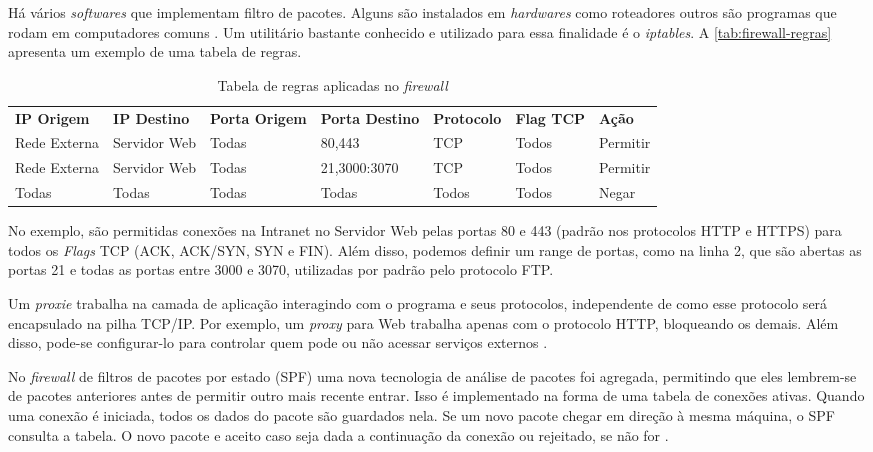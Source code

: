 Há vários \textit{softwares} que implementam filtro de pacotes. Alguns são instalados em \textit{hardwares} como roteadores outros são programas que rodam em computadores comuns \cite{univhacker}. Um utilitário bastante conhecido e utilizado para essa finalidade é o \textit{iptables}. A \autoref{tab:firewall-regras} apresenta um exemplo de uma tabela de regras.

\begin{table}[htb]
\ABNTEXfontereduzida
\centering
\caption{Tabela de regras aplicadas no \textit{firewall}}
\label{tab:firewall-regras}
\begin{tabular}{l|l|l|l|l|l|l}
    \textbf{IP Origem} & \textbf{IP Destino}  & \textbf{Porta Origem}  & \textbf{Porta Destino} & \textbf{Protocolo} & \textbf{Flag TCP} & \textbf{Ação} \\
    Rede Externa & Servidor Web & Todas & 80,443 & TCP & Todos & Permitir \\
    Rede Externa & Servidor Web & Todas & 21,3000:3070 & TCP & Todos & Permitir \\
    Todas & Todas & Todas & Todas & Todos & Todos & Negar \\
\end{tabular}
\end{table}

No exemplo, são permitidas conexões na Intranet no Servidor Web pelas portas 80 e 443 (padrão nos protocolos HTTP e HTTPS) para todos os \textit{Flags} TCP (ACK, ACK/SYN, SYN e FIN). Além disso, podemos definir um range de portas, como na linha 2, que são abertas as portas 21 e todas as portas entre 3000 e 3070, utilizadas por padrão pelo protocolo FTP.

Um \textit{proxie} trabalha na camada de aplicação interagindo com o programa e seus protocolos, independente de como esse protocolo será encapsulado na pilha TCP/IP. Por exemplo, um \textit{proxy} para Web trabalha apenas com o protocolo HTTP, bloqueando os demais. Além disso, pode-se configurar-lo para controlar quem pode ou não acessar serviços externos \cite{univhacker}.

No \textit{firewall} de filtros de pacotes por estado (SPF) uma nova tecnologia de análise de pacotes foi agregada, permitindo que eles lembrem-se de pacotes anteriores antes de permitir outro mais recente entrar. Isso é implementado na forma de uma tabela de conexões ativas. Quando uma conexão é iniciada, todos os dados do pacote são guardados nela. Se um novo pacote chegar em direção à mesma máquina, o SPF consulta a tabela. O novo pacote e aceito caso seja dada a continuação da conexão ou rejeitado, se não for \cite{univhacker}.

